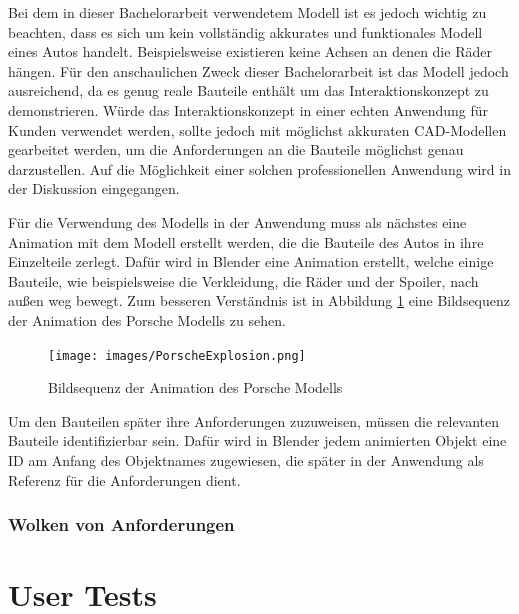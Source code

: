 Bei dem in dieser Bachelorarbeit verwendetem Modell ist es jedoch wichtig zu beachten, dass es sich um kein vollständig akkurates und funktionales Modell eines Autos handelt.
Beispielsweise existieren keine Achsen an denen die Räder hängen.
Für den anschaulichen Zweck dieser Bachelorarbeit ist das Modell jedoch ausreichend, da es genug \glqq{}reale\grqq{}  Bauteile enthält um das Interaktionskonzept zu demonstrieren.
Würde das Interaktionskonzept in einer echten Anwendung für Kunden verwendet werden, sollte jedoch mit möglichst akkuraten CAD-Modellen gearbeitet werden, um die Anforderungen an die Bauteile möglichst genau darzustellen.
Auf die Möglichkeit einer solchen professionellen Anwendung wird in der Diskussion eingegangen.

Für die Verwendung des Modells in der Anwendung muss als nächstes eine Animation mit dem Modell erstellt werden, die die Bauteile des Autos in ihre Einzelteile zerlegt.
Dafür wird in Blender eine Animation erstellt, welche einige Bauteile, wie beispielsweise die Verkleidung, die Räder und der Spoiler, nach außen weg bewegt.
Zum besseren Verständnis ist in Abbildung \ref{fig:porsche-explosion} eine Bildsequenz der Animation des Porsche Modells zu sehen.

\begin{figure}[H]
    \centering
    \texttt{[image: images/PorscheExplosion.png]}
    \caption{Bildsequenz der Animation des Porsche Modells}
    \label{fig:porsche-explosion}
\end{figure}

Um den Bauteilen später ihre Anforderungen zuzuweisen, müssen die relevanten Bauteile identifizierbar sein.
Dafür wird in Blender jedem animierten Objekt eine ID am Anfang des Objektnames zugewiesen, die später in der Anwendung als Referenz für die Anforderungen dient.




\subsubsection{Wolken von Anforderungen}

\section{User Tests}